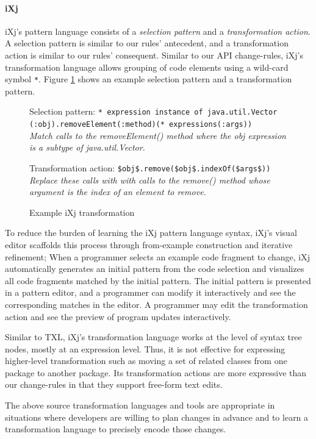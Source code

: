 \documentclass[runningheads,a4paper]{llncs}
\newcommand{\codefont}[1]{\footnotesize{\texttt{#1}}\normalsize}
\begin{document}
\paragraph{iXj} 
iXj's pattern language consists of a {\em selection pattern} and a {\em transformation action}. A selection pattern is similar to our rules' antecedent, and a transformation action is similar to our rules' consequent. Similar to our API change-rules, iXj's transformation language allows grouping of code elements using a wild-card symbol \codefont{*}. Figure \ref{ixj_example} shows an example selection pattern and a transformation pattern. 

\begin{figure} 
Selection pattern: \codefont{* expression instance of java.util.Vector (:obj).removeElement(:method)(* expressions(:args))} \\
\it{Match calls to the {removeElement()} method where the {obj} expression is a subtype of {java.util.Vector}.} 

Transformation action: \codefont{\$obj\$.remove(\$obj\$.indexOf(\$args\$))} \\
\it{Replace these calls with with calls to the {remove()} method whose argument is the index of an element to remove.} 

\caption{Example iXj transformation} 
\label{ixj_example} 
\end{figure} 


To reduce the burden of learning the iXj pattern language syntax, iXj's visual editor scaffolds this process through from-example construction and iterative refinement; When a programmer selects an example code fragment to change, iXj automatically generates an initial pattern from the code selection and visualizes all code fragments matched by the initial pattern. The initial pattern is presented in a pattern editor, and a programmer can modify it interactively and see the corresponding matches in the editor. A programmer may edit the transformation action and see the preview of program updates interactively. 

Similar to TXL, iXj's transformation language works at the level of syntax tree nodes, mostly at an expression level. Thus, it is not effective for expressing higher-level transformation such as moving a set of related classes from one package to another package. Its transformation actions are more expressive than our change-rules in that they support free-form text edits.

The above source transformation languages and tools are appropriate in situations where developers are willing to plan changes in advance and to learn a transformation language to precisely encode those changes.
\end{document}
